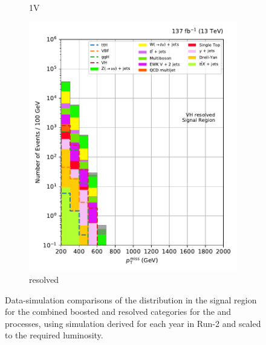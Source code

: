 \begin{figure}[htbp]
\begin{subfigure}[b]{0.24\textwidth}
        \caption{\VH 1V}
    \end{subfigure}
    \hfill
    \begin{subfigure}[b]{0.24\textwidth}
        \includegraphics[width=\textwidth]{figures/region_plots/full_Run2/region_0/VH_resolved.pdf}
        \caption{\VH resolved}
    \end{subfigure}
    \caption[Data-simulation comparisons of the \ptmiss distribution in the signal region for the combined boosted and resolved categories for the \ttH and \VH processes, using simulation derived for each year in Run-2 and scaled to the required luminosity]{Data-simulation comparisons of the \ptmiss distribution in the signal region for the combined boosted and resolved categories for the \ttH and \VH processes, using simulation derived for each year in Run-2 and scaled to the required luminosity.}
    \label{fig:htoinv_sr_yields_comb2016to18}
\end{figure}





